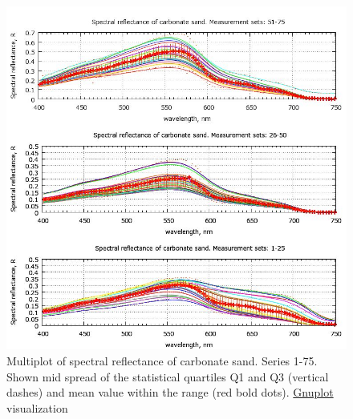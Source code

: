 \documentclass[11pt]{article}
\begin{document}
\begin{figure}[H]
	\begin{center}
		\includegraphics[scale=0.5]{GNU-16.jpg}
		\caption{Multiplot of spectral reflectance of carbonate sand. Series 1-75. Shown mid spread of the statistical quartiles Q1 and Q3 (vertical dashes) and	mean value within the range (red bold dots). \href{http://www.gnuplot.info/}{Gnuplot} visualization­}
		\label{fig:4.14}
	\end{center}
\end{figure}
\end{document}
